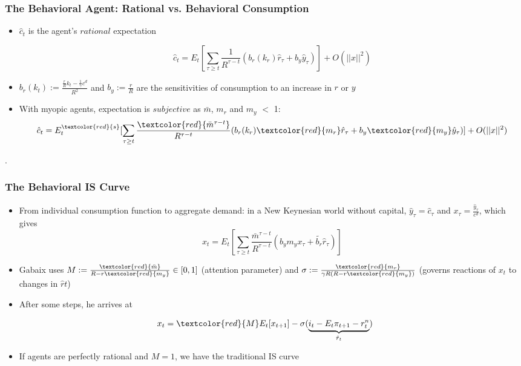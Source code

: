 \documentclass{beamer}
\begin{document}
\begin{frame}
\frametitle{The Behavioral Agent: Rational vs. Behavioral Consumption}
\begin{itemize}
\item $\hat c_{t}$ is the agent's $rational$ expectation 

		$$\hat c_{t}=E_{t}[\sum_{\tau \geq t}\frac{1}{R^{\tau-t}}(b_{r}(k_{r})\hat r_{\tau}+b_{y}\hat y_{\tau})]+O(||x||^2)$$
\item  $b_{r}(k_{t}):=\frac {\frac {r}{R}k_{t}-\frac {1}{\gamma}c^{d}}{R^{2}}$ and $b_{y}:=\frac {r}{R}$ are the sensitivities of consumption to an increase in $r$ or $y$

\item With myopic agents, expectation is $subjective$ as $\bar m$, $m_{r}$ and $m_{y}$  $<$ 1: $$\hat c_{t}=E_{t}^{\textcolor{red}{s}}[\sum_{\tau \geq t}\frac{\textcolor{red}{\bar m^{\tau-t}}}{R^{\tau-t}}(b_{r}(k_{r})\textcolor{red}{m_{r}}\hat r_{\tau}+b_{y}\textcolor{red}{m_{y}}\hat y_{\tau})]+O(||x||^2)$$

\end{itemize}.

\end{frame}


\begin{frame}
\frametitle{The Behavioral IS Curve}
\begin{itemize}
\item From individual consumption function to aggregate demand: in a New Keynesian world without capital, $\hat y_{\tau}=\hat c_{\tau}$ and $x_{\tau}=\frac {\hat y_{\tau}}{c^{d}}$, which gives
	$$x_{t}=E_{t}[\sum_{\tau \geq t}\frac{\bar m^{\tau-t}}{R^{\tau-t}}(b_{y}m_{y}x_{\tau}+\tilde{b_{r}}\hat r_{\tau})]$$
\item Gabaix uses $M:=\frac{\textcolor{red}{\bar m}}{R-r\textcolor{red}{m_{y}}}\in [0,1]$ (attention parameter) and $\sigma:=\frac{\textcolor{red}{m_{r}}}{\gamma R(R-r\textcolor{red}{m_{y}})}$ (governs reactions of $x_{t}$ to changes in $\hat r{t}$)
\item After some steps, he arrives at
\end{itemize}

	$$x_{t}=\textcolor{red}{M}E_{t}[x_{t+1}]-\sigma(\underbrace{i_{t}-E_{t}\pi_{t+1}-r_{t}^{n}}_\text{$\hat r_{t}$})$$

\begin{itemize}
\item If agents are perfectly rational and $M=1$, we have the traditional IS curve
\end{itemize}
\end{frame}
\end{document}
